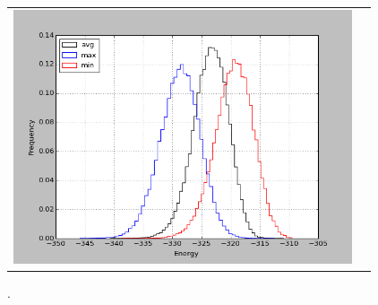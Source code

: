     \begin{figure}[h]
      \centering
      \begin{tabular}{cc} 
        \includegraphics[width=10cm]{graphe/histo2_aa_Tambiante.png} &
      \end{tabular}
      
      \caption{.}
      \label{temps_CPU}
    \end{figure}

    \clearpage



